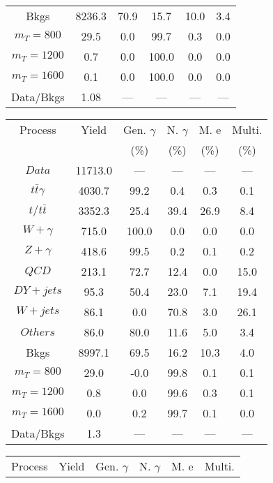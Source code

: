 \begin{figure}
\begin{minipage}[c]{0.32\textwidth}
{\begin{tabular}{cccccc}
Bkgs &  8236.3 &  70.9 &  15.7 &  10.0 &  3.4\\
$ m_{T} = 800 $ &  29.5 &  0.0 &  99.7 &  0.3 &  0.0\\
$ m_{T} = 1200 $ &  0.7 &  0.0 &  100.0 &  0.0 &  0.0\\
$ m_{T} = 1600 $ &  0.1 &  0.0 &  100.0 &  0.0 &  0.0\\
Data/Bkgs &  1.08 &  --- &  --- &  --- &  ---\\
\hline
\end{tabular}
}
\end{minipage}
\begin{minipage}[c]{0.32\textwidth}
\centering
\tiny{
\begin{tabular}{cccccc}
\hline
Process & Yield & Gen. $\gamma$ & N. $\gamma$ & M. e & Multi. \\
 &  & (\%) & (\%) & (\%) & (\%)  \\
\hline
                                                                      $ Data $ &  11713.0 &  --- &  --- &  --- &  ---\\
$ t\bar{t}\gamma $ &  4030.7 &  99.2 &  0.4 &  0.3 &  0.1\\
$ t/t\bar{t} $ &  3352.3 &  25.4 &  39.4 &  26.9 &  8.4\\
$ W+\gamma $ &  715.0 &  100.0 &  0.0 &  0.0 &  0.0\\
$ Z+\gamma $ &  418.6 &  99.5 &  0.2 &  0.1 &  0.2\\
$ QCD $ &  213.1 &  72.7 &  12.4 &  0.0 &  15.0\\
$ DY+jets $ &  95.3 &  50.4 &  23.0 &  7.1 &  19.4\\
$ W+jets $ &  86.1 &  0.0 &  70.8 &  3.0 &  26.1\\
$ Others $ &  86.0 &  80.0 &  11.6 &  5.0 &  3.4\\
Bkgs &  8997.1 &  69.5 &  16.2 &  10.3 &  4.0\\
$ m_{T} = 800 $ &  29.0 &  -0.0 &  99.8 &  0.1 &  0.1\\
$ m_{T} = 1200 $ &  0.8 &  0.0 &  99.6 &  0.3 &  0.1\\
$ m_{T} = 1600 $ &  0.0 &  0.2 &  99.7 &  0.1 &  0.0\\
Data/Bkgs &  1.3 &  --- &  --- &  --- &  ---\\
\hline
\end{tabular}
}
\end{minipage}
\begin{minipage}[c]{0.32\textwidth}
\centering
\tiny{
\begin{tabular}{cccccc}
\hline
Process & Yield & Gen. $\gamma$ & N. $\gamma$ & M. e & Multi. \\

\end{tabular}}
\end{minipage}
\end{figure}

